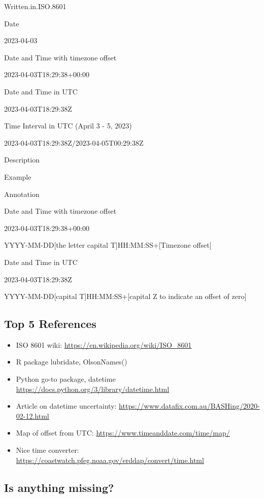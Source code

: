 \documentclass[
  oneside]{book}
\providecommand{\tightlist}{%
  \setlength{\itemsep}{0pt}\setlength{\parskip}{0pt}}
\begin{document}
Written.in.ISO.8601

Date

2023-04-03

Date and Time with timezone offset

2023-04-03T18:29:38+00:00

Date and Time in UTC

2023-04-03T18:29:38Z

Time Interval in UTC (April 3 - 5, 2023)

2023-04-03T18:29:38Z/2023-04-05T00:29:38Z

Description

Example

Annotation

Date and Time with timezone offset

2023-04-03T18:29:38+00:00

YYYY-MM-DD{[}the letter capital T{]}HH:MM:SS+{[}Timezone offset{]}

Date and Time in UTC

2023-04-03T18:29:38Z

YYYY-MM-DD{[}capital T{]}HH:MM:SS+{[}capital Z to indicate an offset of zero{]}

\hypertarget{top-5-references-2}{%
\subsection{Top 5 References}\label{top-5-references-2}}

\begin{itemize}
\tightlist
\item
  ISO 8601 wiki: \url{https://en.wikipedia.org/wiki/ISO_8601}
\item
  R package lubridate, OlsonNames()
\item
  Python go-to package, datetime \url{https://docs.python.org/3/library/datetime.html}
\item
  Article on datetime uncertainty: \url{https://www.datafix.com.au/BASHing/2020-02-12.html}\\
\item
  Map of offset from UTC: \url{https://www.timeanddate.com/time/map/}
\item
  Nice time converter: \url{https://coastwatch.pfeg.noaa.gov/erddap/convert/time.html}
\end{itemize}

\hypertarget{is-anything-missing}{%
\subsection{Is anything missing?}\label{is-anything-missing}}
\end{document}
